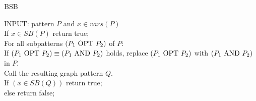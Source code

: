 \begin{algorithm}
	\caption{BSB}\label{bsbalgorithm}
	INPUT: pattern $P$ and $x \in \mathit{vars}(P)$\\
	If $x \in SB(P)$ return true;\\
	For all subpatterns $(P_1 \mbox{ OPT } P_2)$ of $P$:\\
	If $(P_1 \mbox{ OPT } P_2) \equiv (P_1 \mbox{ AND } P_2)$ holds, replace $(P_1 \mbox{ OPT }
	P_2)$ with $(P_1 \mbox{ AND } P_2)$ in $P$.\\
	Call the resulting graph pattern
	$Q$.\\
	If $(x \in \mathit{SB}(Q))$ return true;\\
	else return false;
\end{algorithm}


